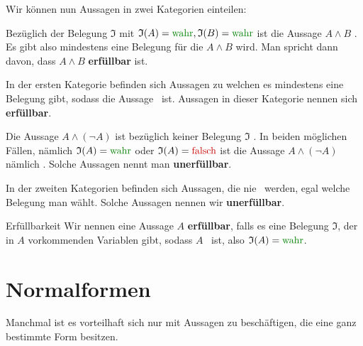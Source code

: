 \documentclass[../../main.tex]{subfiles}
\begin{document}
    Wir können nun Aussagen in zwei Kategorien einteilen:
    \begin{example}{}
        Bezüglich der Belegung $\mathfrak{I}$ mit 
        $\mathfrak{I}(A) = \wahr, \mathfrak{I}(B) = \wahr$ ist die Aussage 
        $A \land B$ \wahr. Es gibt also mindestens eine Belegung für die 
        $A \land B$ \wahr  wird. Man spricht dann davon, 
        dass $A \land B$ \textbf{erfüllbar}
        ist.
    \end{example}
    In der ersten Kategorie befinden sich Aussagen zu welchen 
    es mindestens eine Belegung gibt, sodass die Aussage \wahr\ ist. Aussagen in 
    dieser Kategorie nennen sich \textbf{erfüllbar}.

    \begin{example}{}
        Die Aussage $A \land (\lnot A)$ ist bezüglich keiner Belegung 
        $\mathfrak{I}$ \wahr. In beiden möglichen Fällen, nämlich 
        $\mathfrak{I}(A) = \wahr$ oder $\mathfrak{I}(A) = \falsch$ ist die 
        Aussage $A \land (\lnot A)$ nämlich \falsch. Solche Aussagen nennt man \textbf{unerfüllbar}.
    \end{example}
    In der zweiten Kategorien befinden sich Aussagen, die nie \wahr\ werden, egal 
    welche Belegung man wählt. Solche Aussagen nennen wir \textbf{unerfüllbar}.

    \begin{definition}{Erfüllbarkeit}
        Wir nennen eine Aussage $A$ \textbf{erfüllbar}, falls es eine 
        Belegung $\mathfrak{I}$, der in $A$ vorkommenden Variablen gibt, 
        sodass $A$ \wahr\ ist, also $\mathfrak{I}(A) = \wahr$.
    \end{definition}

    \newpage


    \section*{Normalformen}
    Manchmal ist es vorteilhaft sich nur mit Aussagen zu beschäftigen, 
    die eine ganz bestimmte Form besitzen.
\end{document}
